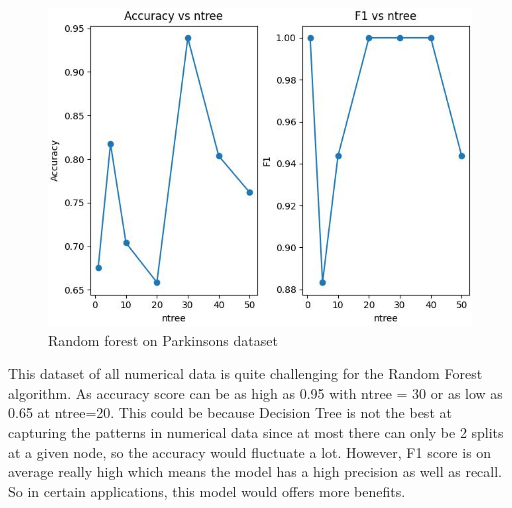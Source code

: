 \documentclass[letterpaper]{article}
\begin{document}
\begin{figure}[H]
	\includegraphics[width=\textwidth]{figures/forest_parkinsons.csv_ig.jpg}
	\caption{Random forest on Parkinsons dataset}
	\label{fig:forest-parkinsons}
\end{figure}

This dataset of all numerical data is quite challenging for the Random Forest algorithm. As accuracy score can be as high as 0.95 with ntree = 30
or as low as 0.65 at ntree=20. This could be because Decision Tree is not the best at capturing the patterns in numerical data since at most there
can only be 2 splits at a given node, so the accuracy would fluctuate a lot. However, F1 score is on average really high which means the model has
a high precision as well as recall. So in certain applications, this model would offers more benefits.
\end{document}
